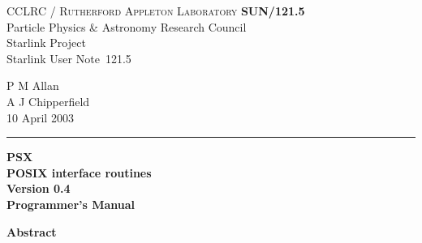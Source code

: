 \documentclass[twoside,11pt]{article}
\newcommand{\stardoccategory}  {Starlink User Note}
\newcommand{\stardocinitials}  {SUN}
\newcommand{\stardocnumber}    {121.5}
\newcommand{\stardocauthors}   {P M Allan\\
                                A J Chipperfield}
\newcommand{\stardocdate}      {10 April 2003}
\newcommand{\stardoctitle}     {PSX \\ [1ex]
                                POSIX interface routines}
\newcommand{\stardocversion}   {Version 0.4}
\newcommand{\stardocmanual}    {Programmer's Manual}
\newcommand{\stardocname}{\stardocinitials /\stardocnumber}
\newenvironment{latexonly}{}{}
\renewcommand{\_}{\texttt{\symbol{95}}}
\begin{document}
\thispagestyle{empty}

\begin{latexonly}
   CCLRC / \textsc{Rutherford Appleton Laboratory} \hfill \textbf{\stardocname}\\
   {\large Particle Physics \& Astronomy Research Council}\\
   {\large Starlink Project\\}
   {\large \stardoccategory\ \stardocnumber}
   \begin{flushright}
   \stardocauthors\\
   \stardocdate
   \end{flushright}
   \vspace{-4mm}
   \rule{\textwidth}{0.5mm}
   \vspace{5mm}
   \begin{center}
   {\Huge\textbf{\stardoctitle \\ [2.5ex]}}
   {\LARGE\textbf{\stardocversion \\ [4ex]}}
   {\Huge\textbf{\stardocmanual}}
   \end{center}
   \vspace{5mm}


   \vspace{10mm}
   \begin{center}
      {\Large\textbf{Abstract}}
   \end{center}
\end{latexonly}
\end{document}
